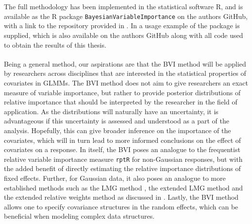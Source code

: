 \\
\\
The full methodology has been implemented in the statistical software R, and is available as the R package \texttt{BayesianVariableImportance} on the authors GitHub, with a link to the repository provided in . In  a usage example of the package is supplied, which is also available on the authors GitHub along with all code used to obtain the results of this thesis.
\\
\\
Being a general method, our aspirations are that the BVI method will be applied by researchers across disciplines that are interested in the statistical properties of covariates in GLMMs. The BVI method does not aim to give researchers an exact measure of variable importance, but rather to provide posterior distributions of relative importance that should be interpreted by the researcher in the field of application. As the distributions will naturally have an uncertainty, it is advantageous if this uncertainty is assessed and understood as a part of the analysis. Hopefully, this can give broader inference on the importance of the covariates, which will in turn lead to more informed conclusions on the effect of covariates on a response. In itself, the BVI poses an analogue to the frequentist relative variable importance measure \texttt{rptR} for non-Gaussian responses, but with the added benefit of directly estimating the relative importance distributions of fixed effects. Further, for Gaussian data, it also poses an analogue to more established methods such as the LMG method \citep{gromping_relaimpo}, the extended LMG method \citep{matre} and the extended relative weights method \citep{matre} as discussed in \citet{Arnstad:Relative_variable_importance_in_Bayesian_linear_mixed_models:2024}. Lastly, the BVI method allows one to specify covariance structures in the random effects, which can be beneficial when modeling complex data structures.
\\
\\
